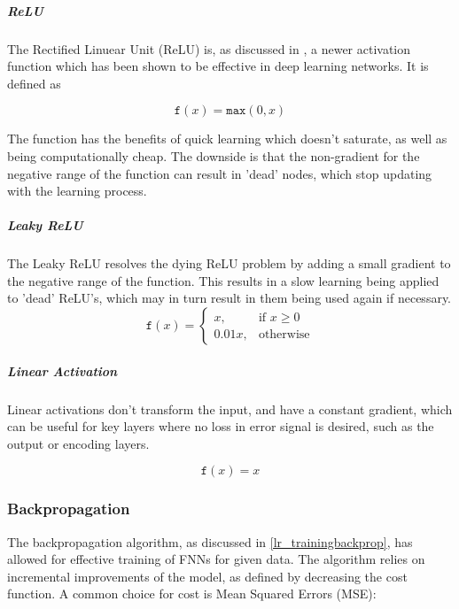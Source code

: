 \documentclass[a4paper,latin]{paper}
\begin{document}
\subparagraph{ReLU}

The Rectified Linuear Unit (ReLU) is, as discussed in , a newer activation function which has been shown to be effective in deep learning networks. It is defined as

\begin{equation}\label{func_relu}
\texttt{f}(x) = \texttt{max}(0, x)
\end{equation}

The function has the benefits of quick learning which doesn't saturate, as well as being computationally cheap. The downside is that the non-gradient for the negative range of the function can result in 'dead' nodes, which stop updating with the learning process.

\subparagraph{Leaky ReLU}

The Leaky ReLU resolves the dying ReLU problem by adding a small gradient to the negative range of the function. This results in a slow learning being applied to 'dead' ReLU's, which may in turn result in them being used again if necessary.
\begin{equation}\end{equation}\label{func_leaky_relu}
\[
\texttt{f}(x)= 
\begin{cases}
x,& \text{if } x\geq 0\\
0.01x,              & \text{otherwise}
\end{cases}
\]


\subparagraph{Linear Activation}

Linear activations don't transform the input, and have a constant gradient, which can be useful for key layers where no loss in error signal is desired, such as the output or encoding layers.

\begin{equation}\label{func_linear}
\texttt{f}(x) = x
\end{equation}


\subsubsection{Backpropagation}\label{imp_backprop}

The backpropagation algorithm, as discussed in \ref{lr_trainingbackprop}, has allowed for effective training of FNNs for given data. The algorithm relies on incremental improvements of the model, as defined by decreasing the cost function. A common choice for cost is Mean Squared Errors (MSE):
\end{document}
